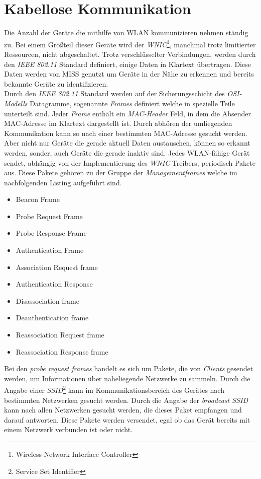 \documentclass[]{report}
\begin{document}
\section{Kabellose Kommunikation}
Die Anzahl der Geräte die mithilfe von WLAN kommunizieren nehmen ständig zu. Bei einem Großteil dieser Geräte wird der \textit{WNIC}\footnote{Wireless Network Interface Controller}, manchmal trotz limitierter Ressourcen, nicht abgeschaltet. Trotz verschlüsselter Verbindungen, werden durch den \textit{IEEE 802.11} Standard \cite{IEEE} definiert, einige Daten in Klartext übertragen. Diese Daten werden von MISS genutzt um Geräte in der Nähe zu erkennen und bereits bekannte Geräte zu identifizieren. \\
Durch den \textit{IEEE 802.11} Standard werden auf der Sicherungsschicht des \textit{OSI-Modells} \cite{OSI}  Datagramme, sogenannte \textit{Frames} definiert welche in spezielle Teile unterteilt sind. Jeder \textit{Frame} enthält ein \textit{MAC-Header} Feld, in dem die Absender MAC-Adresse im Klartext dargestellt ist. Durch abhören der umliegenden Kommunikation kann so nach einer bestimmten MAC-Adresse gesucht werden. \\
Aber nicht nur Geräte die gerade aktuell Daten austauschen, können so erkannt werden, sonder, auch Geräte die gerade inaktiv sind. Jedes WLAN-fähige Gerät sendet, abhängig von der Implementierung des \textit{WNIC} Treibers, periodisch Pakete aus. Diese Pakete gehören zu der Gruppe der \textit{Managementframes} welche im nachfolgenden Listing aufgeführt sind. \\
\begin{itemize}
	\item Beacon Frame
	\item Probe Request Frame
	\item Probe-Response Frame
	\item Authentication Frame
	\item Association Request frame
	\item Authentication Response
	\item Disassociation frame
	\item Deauthentication frame
	\item Reassociation Request frame
	\item Reassociation Response frame
\end{itemize}
Bei den \textit{probe request frames} handelt es sich um Pakete, die von \textit{Clients} gesendet werden, um Informationen über naheliegende Netzwerke zu sammeln. Durch die Angabe einer \textit{SSID}\footnote{Service Set Identifier} kann im Kommunikationsbereich des Gerätes nach bestimmten Netzwerken gesucht werden. Durch die Angabe der \textit{broadcast SSID} kann nach allen Netzwerken gesucht werden, die dieses Paket empfangen und darauf antworten. Diese Pakete werden versendet, egal ob das Gerät bereits mit einem Netzwerk verbunden ist oder nicht.\\
\end{document}
